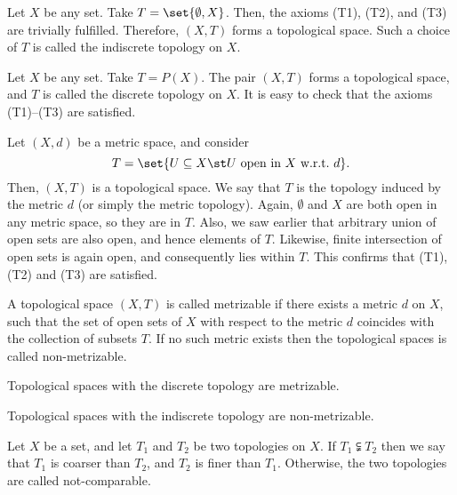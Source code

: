 \begin{negg}
  Let $X$ be any set. Take $T = \set{\emptyset, X}$. Then, the axioms (T1), (T2), and (T3) are trivially fulfilled. Therefore, $(X,T)$ forms a topological space. Such a choice of $T$ is called the indiscrete topology on $X$.\eggqed
\end{negg}

\begin{negg}
  Let $X$ be any set. Take $T = P(X)$. The pair $(X,T)$ forms a topological space, and $T$ is called the discrete topology on $X$. It is easy to check that the axioms (T1)--(T3) are satisfied.\eggqed
\end{negg}

\begin{negg}
  Let $(X,d)$ be a metric space, and consider
  \begin{equation*}
    T = \set{U \subseteq X \st U\ \text{open in}\ X\ \text{w.r.t.}\ d}.
  \end{equation*}
  Then, $(X,T)$ is a topological space. We say that $T$ is the topology induced by the metric $d$ (or simply the metric topology). Again, $\emptyset$ and $X$ are both open in any metric space, so they are in $T$. Also, we saw earlier that arbitrary union of open sets are also open, and hence elements of $T$. Likewise, finite intersection of open sets is again open, and consequently lies within $T$. This confirms that (T1), (T2) and (T3) are satisfied.\eggqed
\end{negg}

\begin{ndfn}[Metrizable]
  A topological space $(X,T)$ is called metrizable if there exists a metric $d$ on $X$, such that the set of open sets of $X$ with respect to the metric $d$ coincides with the collection of subsets $T$. If no such metric exists then the topological spaces is called non-metrizable.
\end{ndfn}

\begin{nprop}
  Topological spaces with the discrete topology are metrizable.
\end{nprop}

\begin{nprop}
  Topological spaces with the indiscrete topology are non-metrizable.
\end{nprop}

\begin{ndfn}
  Let $X$ be a set, and let $T_1$ and $T_2$ be two topologies on $X$. If $T_1 \subsetneqq T_2$ then we say that $T_1$ is coarser than $T_2$, and $T_2$ is finer than $T_1$. Otherwise, the two topologies are called not-comparable.
\end{ndfn}

